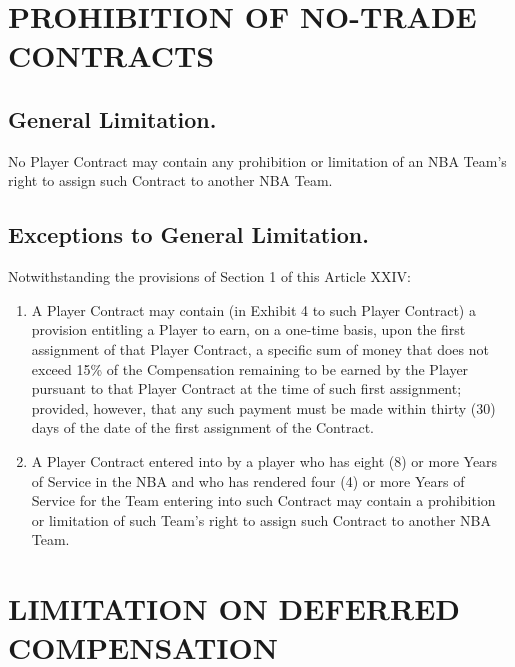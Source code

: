 \documentclass[
]{book}
\providecommand{\tightlist}{%
  \setlength{\itemsep}{0pt}\setlength{\parskip}{0pt}}
\begin{document}
\hypertarget{prohibition-of-no-trade-contracts}{%
\chapter{PROHIBITION OF NO-TRADE CONTRACTS}\label{prohibition-of-no-trade-contracts}}

\hypertarget{general-limitation.}{%
\section{General Limitation.}\label{general-limitation.}}

No Player Contract may contain any prohibition or limitation of an NBA Team's right to assign such Contract to another NBA Team.

\hypertarget{exceptions-to-general-limitation.}{%
\section{Exceptions to General Limitation.}\label{exceptions-to-general-limitation.}}

Notwithstanding the provisions of Section 1 of this Article XXIV:

\begin{enumerate}
\def\labelenumi{(\alph{enumi})}
\tightlist
\item
  A Player Contract may contain (in Exhibit 4 to such Player Contract) a provision entitling a Player to earn, on a one-time basis, upon the first assignment of that Player Contract, a specific sum of money that does not exceed 15\% of the Compensation remaining to be earned by the Player pursuant to that Player Contract at the time of such first assignment; provided, however, that any such payment must be made within thirty (30) days of the date of the first assignment of the Contract.
\item
  A Player Contract entered into by a player who has eight (8) or more Years of Service in the NBA and who has rendered four (4) or more Years of Service for the Team entering into such Contract may contain a prohibition or limitation of such Team's right to assign such Contract to another NBA Team.
\end{enumerate}

\hypertarget{limitation-on-deferred-compensation}{%
\chapter{LIMITATION ON DEFERRED COMPENSATION}\label{limitation-on-deferred-compensation}}
\end{document}
